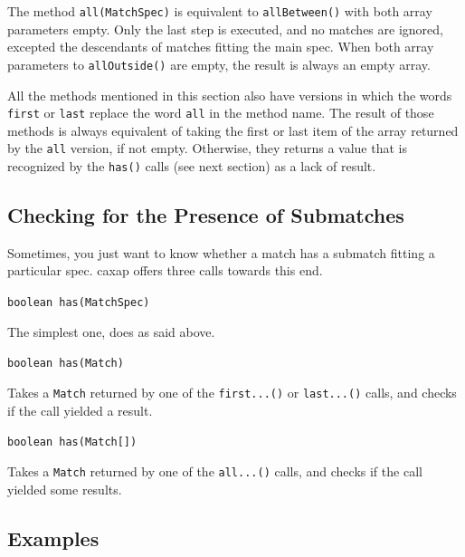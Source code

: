 The method \texttt{all(MatchSpec)} is equivalent to \texttt{allBetween()} with
both array parameters empty. Only the last step is executed, and no matches are
ignored, excepted the descendants of matches fitting the main spec. When both
array parameters to \texttt{allOutside()} are empty, the result is always an
empty array.

All the methods mentioned in this section also have versions in which the words
\texttt{first} or \texttt{last} replace the word \texttt{all} in the method
name. The result of those methods is always equivalent of taking the first or
last item of the array returned by the \texttt{all} version, if not
empty. Otherwise, they returns a value that is recognized by the \texttt{has()}
calls (see next section) as a lack of result.

\subsection{Checking for the Presence of Submatches}

Sometimes, you just want to know whether a match has a submatch fitting a
particular spec. caxap offers three calls towards this end.

\begin{description}

\item \texttt{boolean has(MatchSpec)}

  The simplest one, does as said above.

\item \texttt{boolean has(Match)}

  Takes a \texttt{Match} returned by one of the \texttt{first...()} or
  \texttt{last...()} calls, and checks if the call yielded a result.

\item \texttt{boolean has(Match[])}

  Takes a \texttt{Match} returned by one of the \texttt{all...()} calls, and
  checks if the call yielded some results.

\end{description}

\subsection{Examples}


